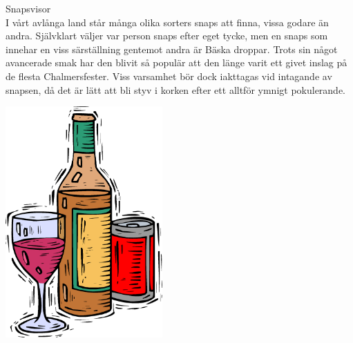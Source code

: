  \begin{flushleft}
{\Huge Snapsvisor\\}
\vspace{1 cm}
{\Large
I vårt avlånga land står många olika sorters snaps att finna, vissa godare
än andra. Självklart väljer var person snaps efter eget tycke, men en snaps som innehar en viss särställning gentemot andra är
Bäska droppar. Trots sin något avancerade smak har den blivit så populär
att den länge varit ett givet inslag på de flesta Chalmersfester. Viss varsamhet bör
dock iakttagas vid intagande av snapsen, då det är lätt att bli styv i
korken efter ett alltför ymnigt pokulerande. 
}
\end{flushleft}
\vspace{2cm}
\begin{center}
\includegraphics[width=6cm]{bilder/8.eps}
\end{center}

\newpage




\newpage



\newpage


\newpage





\newpage


